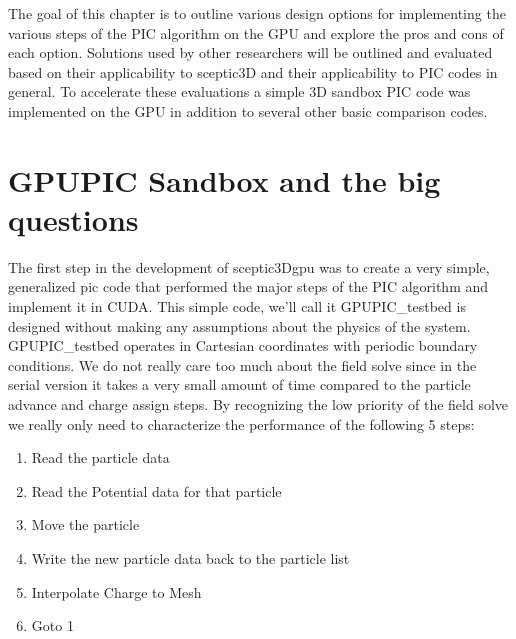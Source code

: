 The goal of this chapter is to outline various design options for implementing the various steps of the PIC algorithm on the GPU and explore the pros and cons of each option. Solutions used by other researchers will be outlined and evaluated based on their applicability to sceptic3D and their applicability to PIC codes in general. To accelerate these evaluations a simple 3D sandbox PIC code was implemented on the GPU in addition to several other basic comparison codes. 



	\section{GPUPIC Sandbox and the big questions}
The first step in the development of sceptic3Dgpu was to create a very simple, generalized pic code that performed the major steps of the PIC algorithm and implement it in CUDA. This simple code, we'll call it GPUPIC\_testbed is designed without making any assumptions about the physics of the system. GPUPIC\_testbed operates in Cartesian coordinates with periodic boundary conditions. We do not really care too much about the field solve since in the serial version it takes a very small amount of time compared to the particle advance and charge assign steps. By recognizing the low priority of the field solve we really only need to characterize the performance of the following 5 steps:


\begin{enumerate}\itemsep0pt \parskip0pt 
\item Read the particle data
\item Read the Potential data for that particle
\item Move the particle
\item Write the new particle data back to the particle list
\item Interpolate Charge to Mesh
\item Goto 1
\end{enumerate}




